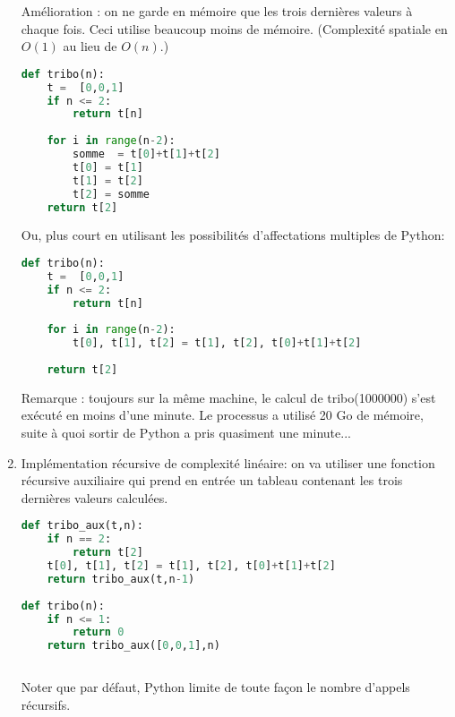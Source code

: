 \documentclass[11pt,a4paper]{article}
\begin{document}
\begin{enumerate}
Amélioration : on ne garde en mémoire que les trois dernières valeurs à chaque fois. Ceci utilise beaucoup moins de mémoire. (Complexité spatiale en $O(1)$ au lieu de $O(n)$.)
\begin{lstlisting}[language=Python]
def tribo(n):
	t =  [0,0,1]
	if n <= 2:
		return t[n]
		
	for i in range(n-2):
		somme  = t[0]+t[1]+t[2]
		t[0] = t[1]
		t[1] = t[2]
		t[2] = somme
	return t[2]
\end{lstlisting}

Ou, plus court en utilisant les possibilités d'affectations multiples de Python:
\begin{lstlisting}[language=Python]
def tribo(n):
	t =  [0,0,1]
	if n <= 2:
		return t[n]
		
	for i in range(n-2):
		t[0], t[1], t[2] = t[1], t[2], t[0]+t[1]+t[2]
		
	return t[2]
\end{lstlisting}

Remarque : toujours sur la même machine,  le calcul de tribo(1000000) s'est exécuté en moins d'une minute. Le processus a utilisé 20 Go de mémoire, suite à quoi sortir de Python a pris quasiment une minute...


\item Implémentation récursive de complexité linéaire: on va  utiliser une fonction récursive auxiliaire qui prend en entrée un tableau contenant les trois dernières valeurs calculées.
\begin{lstlisting}[language=Python]
def tribo_aux(t,n):
	if n == 2:
		return t[2]
	t[0], t[1], t[2] = t[1], t[2], t[0]+t[1]+t[2]
	return tribo_aux(t,n-1)
	
def tribo(n):
	if n <= 1:
		return 0
	return tribo_aux([0,0,1],n)
	
\end{lstlisting}
Noter que par défaut, Python limite de toute façon le nombre d'appels récursifs.
\end{enumerate}
\end{document}
